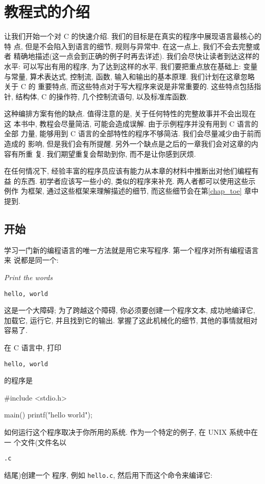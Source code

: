 
\chapter{教程式的介绍}\label{chap_tuto}
让我们开始一个对 C 的快速介绍. 我们的目标是在真实的程序中展现语言最核心的特
点, 但是不会陷入到语言的细节, 规则与异常中. 在这一点上, 我们不会去完整或者
精确地描述(这一点会到正确的例子时再去详述). 我们会尽快让读者到达这样的水平:
可以写出有用的程序, 为了达到这样的水平, 我们要把重点放在基础上: 变量与常量,
算术表达式, 控制流, 函数, 输入和输出的基本原理. 我们计划在这章忽略关于 C 的
重要特点, 而这些特点对于写大程序来说是非常重要的. 这些特点包括指针, 结构体,
C 的操作符, 几个控制流语句, 以及标准库函数.

这种编排方案有他的缺点. 值得注意的是, 关于任何特性的完整故事并不会出现在这
本书中, 教程会尽量简洁, 可能会造成误解. 由于示例程序并没有用到 C 语言的全部
力量, 能够用到 C 语言的全部特性的程序不够简洁. 我们会尽量减少由于前而造成的
影响, 但是我们会有所提醒. 另外一个缺点是之后的一章我们会对这章的内容有所重
复. 我们期望重复会帮助到你, 而不是让你感到厌烦.

在任何情况下, 经验丰富的程序员应该有能力从本章的材料中推断出对他们编程有益
的东西. 初学者应该写一些小的, 类似的程序来补充. 两人者都可以使用这些示例作
为框架, 通过这些框架来理解描述的细节, 而这些细节会在第\ref{chap_toe} 章中提到.

\section{开始}
学习一门新的编程语言的唯一方法就是用它来写程序. 第一个程序对所有编程语言来
说都是同一个:

\textit{Print the words}

\verb"hello, world"

这是一个大障碍; 为了跨越这个障碍, 你必须要创建一个程序文本, 成功地编译它, 
加载它, 运行它, 并且找到它的输出. 掌握了这此机械化的细节, 其他的事情就相对
容易了.

在 C 语言中, 打印 \begin{myquotation}\verb"hello, world"\end{myquotation}
的程序是
\begin{myverbatim}
#include <stdio.h>

main()
{
    printf("hello world\n");
}
\end{myverbatim}

如何运行这个程序取决于你所用的系统. 作为一个特定的例子, 在 UNIX 系统中在一
个文件(文件名以\begin{myquotation}\verb".c"\end{myquotation}结尾)创建一个%
程序, 例如 \verb"hello.c", 然后用下而这个命令来编译它:

